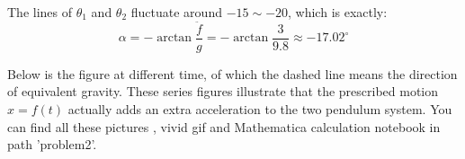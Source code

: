 The lines of $\theta_1$ and $\theta_2$ fluctuate around $-15\sim-20$, 
which is exactly:
\begin{equation}
    \alpha = -\arctan\frac{\ddot{f}}{g} = -\arctan\frac{3}{9.8}\approx -17.02^\circ
\end{equation}

Below is the figure at different time, of which the dashed line means the direction of 
equivalent gravity. 
These series figures illustrate that the prescribed motion $x=f(t)$ actually adds an extra 
acceleration to the two pendulum system. 
You can find all these pictures , vivid gif and Mathematica calculation notebook in path 'problem2'.
\begin{figure}[H]
    \centering
    \quad
    \\
    \quad
    \\
\end{figure}
